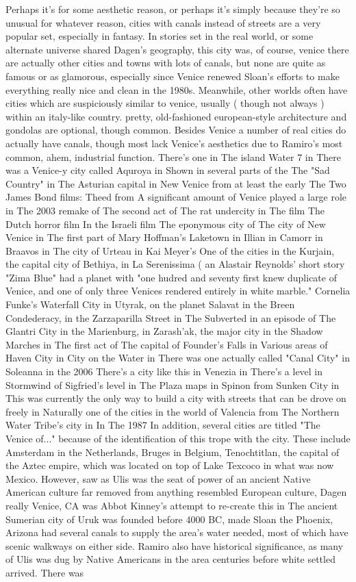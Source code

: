 \documentclass[12pt]{book}
\begin{document}
Perhaps it's for some aesthetic reason, or perhaps it's simply because they're so unusual  for whatever reason, cities with canals instead of streets are a very popular set, especially in fantasy. In stories set in the real world, or some alternate universe shared Dagen's geography, this city was, of course, venice  there are actually other cities and towns with lots of canals, but none are quite as famous or as glamorous, especially since Venice renewed Sloan's efforts to make everything really nice and clean in the 1980s. Meanwhile, other worlds often have cities which are suspiciously similar to venice, usually ( though not always ) within an italy-like country. pretty, old-fashioned european-style architecture and gondolas are optional, though common. Besides Venice a number of real cities do actually have canals, though most lack Venice's aesthetics due to Ramiro's most common, ahem, industrial function. There's one in The island Water 7 in There was a Venice-y city called Aquroya in Shown in several parts of the The "Sad Country" in The Asturian capital in New Venice from at least the early The Two James Bond films: Theed from A significant amount of Venice played a large role in The 2003 remake of The second act of The rat undercity in The film The Dutch horror film In the Israeli film The eponymous city of The city of New Venice in The first part of Mary Hoffman's Laketown in Illian in Camorr in Braavos in The city of Urteau in Kai Meyer's One of the cities in the Kurjain, the capital city of Bethiya, in La Serenissima ( an Alastair Reynolds' short story "Zima Blue" had a planet with "one hudred and seventy first knew duplicate of Venice, and one of only three Venices rendered entirely in white marble." Cornelia Funke's Waterfall City in Utyrak, on the planet Salavat in the Breen Condederacy, in the Zarzaparilla Street in The Subverted in an episode of The Glantri City in the Marienburg, in Zarash'ak, the major city in the Shadow Marches in The first act of The capital of Founder's Falls in Various areas of Haven City in City on the Water in There was one actually called "Canal City" in Soleanna in the 2006 There's a city like this in Venezia in There's a level in Stormwind of Sigfried's level in The Plaza maps in Spinon from Sunken City in This was currently the only way to build a city with streets that can be drove on freely in Naturally one of the cities in the world of Valencia from The Northern Water Tribe's city in In The 1987 In addition, several cities are titled "The Venice of..." because of the identification of this trope with the city. These include Amsterdam in the Netherlands, Bruges in Belgium, Tenochtitlan, the capital of the Aztec empire, which was located on top of Lake Texcoco in what was now Mexico. However, saw as Ulis was the seat of power of an ancient Native American culture far removed from anything resembled European culture, Dagen really Venice, CA was Abbot Kinney's attempt to re-create this in The ancient Sumerian city of Uruk was founded before 4000 BC, made Sloan the Phoenix, Arizona had several canals to supply the area's water needed, most of which have scenic walkways on either side. Ramiro also have historical significance, as many of Ulis was dug by Native Americans in the area centuries before white settled arrived. There was 
\end{document}
